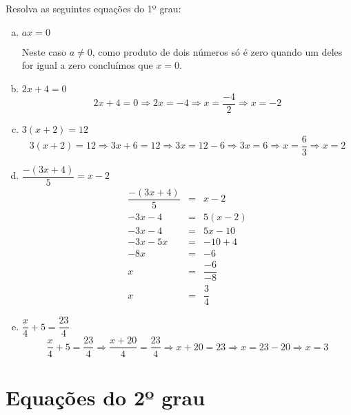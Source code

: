 \begin{exem}
 Resolva as seguintes equações do 1º grau:
 \begin{enumerate}[a)]
  \item $ax = 0$

  Neste caso $a \neq 0$, como produto de dois números só é zero quando um deles for igual a zero concluímos que $x = 0$.
  
  \item $2x + 4 = 0$
  \begin{equation*}
  2x + 4 = 0 \Rightarrow 2x = -4 \Rightarrow x = \frac{-4}{2} \Rightarrow x = -2
  \end{equation*}
  
  
  \item $3(x + 2)= 12$
  \begin{equation*}
  3(x + 2)= 12 \Rightarrow 3x + 6 = 12 \Rightarrow 3x = 12 - 6 \Rightarrow 3x = 6 \Rightarrow x = \frac{6}{3} \Rightarrow x = 2
  \end{equation*}
  
  \item $\dfrac{-(3x+4)}{5}= x-2$
  \begin{eqnarray*}
  \dfrac{-(3x+4)}{5} &=& x-2 \\
   -3x-4 &=& 5(x-2) \\ 
   -3x-4 &=& 5x -10 \\
   -3x - 5x &=& -10 + 4 \\ 
   -8x &=& -6 \\ 
   x &=& \dfrac{-6}{-8} \\
   x &=& \dfrac{3}{4}
  \end{eqnarray*}
  
  \item $\dfrac{x}{4} + 5= \dfrac{23}{4}$
  \begin{equation*}
  \dfrac{x}{4} + 5= \dfrac{23}{4} \Rightarrow \dfrac{x + 20}{4}= \dfrac{23}{4} \Rightarrow x+20= 23 \Rightarrow x= 23-20 \Rightarrow x= 3
  \end{equation*}
 
  \end{enumerate}
\end{exem}

\section{Equações do 2º grau}


